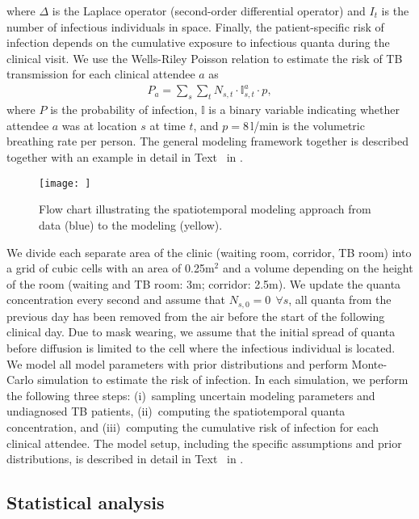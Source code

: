 \documentclass[fleqn,11pt]{wlscirep}
\begin{document}
where $\Delta$ is the Laplace operator (second-order differential operator) and $I_t$ is the number of infectious individuals in space. Finally, the patient-specific risk of infection depends on the cumulative exposure to infectious quanta during the clinical visit. We use the Wells-Riley Poisson relation to estimate the risk of TB transmission for each clinical attendee $a$ as 
\begin{align}
    P_a = \sum_s \sum_t N_{s,t} \cdot \mathbb{I}_{s,t}^a \cdot p,
\end{align}
where $P$ is the probability of infection, $\mathbb{I}$ is a binary variable indicating whether attendee $a$ was at location $s$ at time $t$, and $p = 8$\,l/min is the volumetric breathing rate per person. The general modeling framework together is described together with an example in detail in Text~ in \supp. 

\begin{figure}
    \centering
    \texttt{[image: ]}
    \caption{Flow chart illustrating the spatiotemporal modeling approach from data (blue) to the modeling (yellow).}
    \label{fig:modeling-flow}
\end{figure}

We divide each separate area of the clinic (waiting room, corridor, TB room) into a grid of cubic cells with an area of 0.25m$^2$ and a volume depending on the height of the room (waiting and TB room: 3m; corridor: 2.5m). We update the quanta concentration every second and assume that $N_{s,0} = 0 ~~ \forall s$, \ie all quanta from the previous day has been removed from the air before the start of the following clinical day. Due to mask wearing, we assume that the initial spread of quanta before diffusion is limited to the cell where the infectious individual is located. We model all model parameters with prior distributions and perform Monte-Carlo simulation to estimate the risk of infection. In each simulation, we perform the following three steps: (i)~sampling uncertain modeling parameters and undiagnosed TB patients, (ii)~computing the spatiotemporal quanta concentration, and (iii)~computing the cumulative risk of infection for each clinical attendee. The model setup, including the specific assumptions and prior distributions, is described in detail in Text~ in \supp.



\subsection{Statistical analysis}
\end{document}

